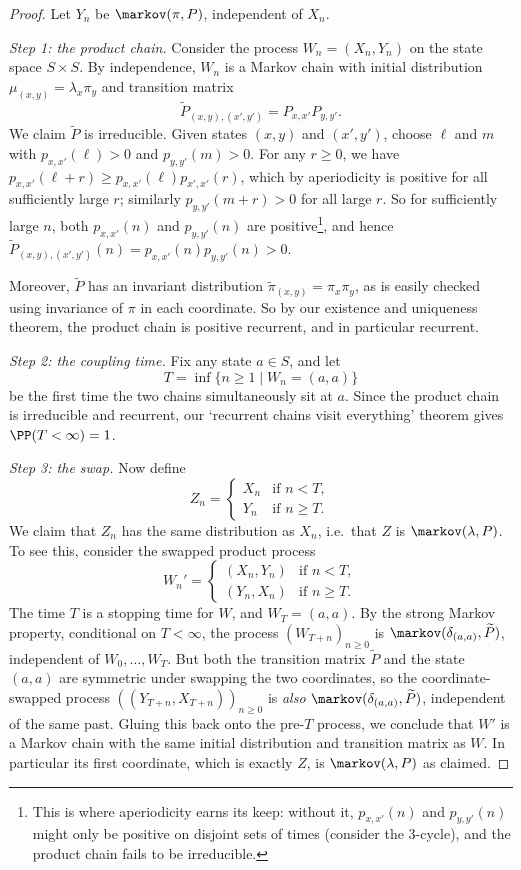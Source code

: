 \begin{proof}
	Let $Y_n$ be $\markov(\pi, P)$, independent of $X_n$.

	\emph{Step 1: the product chain.} Consider the process $W_n = (X_n, Y_n)$ on the state space $S \times S$. By independence, $W_n$ is a Markov chain with initial distribution $\mu_{(x, y)} = \lambda_x \pi_y$ and transition matrix
	$$
	\widetilde{P}_{(x, y), (x', y')} = P_{x, x'}P_{y, y'}.
	$$
	We claim $\widetilde{P}$ is irreducible. Given states $(x, y)$ and $(x', y')$, choose $\ell$ and $m$ with $p_{x, x'}(\ell) > 0$ and $p_{y, y'}(m) > 0$. For any $r \geq 0$, we have $p_{x, x'}(\ell + r) \geq p_{x, x'}(\ell)p_{x', x'}(r)$, which by aperiodicity is positive for all sufficiently large $r$; similarly $p_{y, y'}(m + r) > 0$ for all large $r$. So for sufficiently large $n$, both $p_{x, x'}(n)$ and $p_{y, y'}(n)$ are positive\footnote{This is where aperiodicity earns its keep: without it, $p_{x, x'}(n)$ and $p_{y, y'}(n)$ might only be positive on disjoint sets of times (consider the 3-cycle), and the product chain fails to be irreducible.}, and hence
	$
	\widetilde{P}_{(x, y), (x', y')}(n) = p_{x, x'}(n)p_{y, y'}(n) > 0.
	$

	Moreover, $\widetilde{P}$ has an invariant distribution $\widetilde{\pi}_{(x, y)} = \pi_x \pi_y$, as is easily checked using invariance of $\pi$ in each coordinate. So by our existence and uniqueness theorem, the product chain is positive recurrent, and in particular recurrent.

	\emph{Step 2: the coupling time.} Fix any state $a \in S$, and let
	$$
	T = \inf\{n \geq 1 \mid W_n = (a, a)\}
	$$
	be the first time the two chains simultaneously sit at $a$. Since the product chain is irreducible and recurrent, our `recurrent chains visit everything' theorem gives $\PP(T < \infty) = 1$.

	\emph{Step 3: the swap.} Now define
	$$
	Z_n = \begin{cases}
		X_n &\mbox{if } n < T, \\
		Y_n &\mbox{if } n \geq T.
	   \end{cases}
	$$
	We claim that $Z_n$ has the same distribution as $X_n$, i.e.\ that $Z$ is $\markov(\lambda, P)$. To see this, consider the swapped product process
	$$
	W_n' = \begin{cases}
		(X_n, Y_n) &\mbox{if } n < T, \\
		(Y_n, X_n) &\mbox{if } n \geq T.
	   \end{cases}
	$$
	The time $T$ is a stopping time for $W$, and $W_T = (a, a)$. By the strong Markov property, conditional on $T < \infty$, the process $(W_{T + n})_{n \geq 0}$ is $\markov(\delta_{(a, a)}, \widetilde{P})$, independent of $W_0, \dots, W_T$. But both the transition matrix $\widetilde{P}$ and the state $(a, a)$ are symmetric under swapping the two coordinates, so the coordinate-swapped process $((Y_{T + n}, X_{T + n}))_{n \geq 0}$ is \emph{also} $\markov(\delta_{(a, a)}, \widetilde{P})$, independent of the same past. Gluing this back onto the pre-$T$ process, we conclude that $W'$ is a Markov chain with the same initial distribution and transition matrix as $W$. In particular its first coordinate, which is exactly $Z$, is $\markov(\lambda, P)$ as claimed.


\end{proof}
